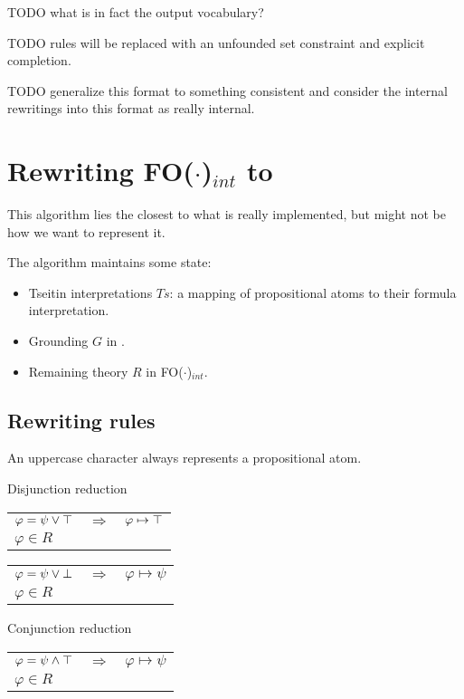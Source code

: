 \documentclass{article}
\newcommand{\indot}{{\sc FO($\cdot$)$_{int}$}\xspace}
\begin{document}
TODO what is in fact the output vocabulary?

TODO rules will be replaced with an unfounded set constraint and explicit completion.

TODO generalize this format to something consistent and consider the internal rewritings into this format as really internal.

\section{Rewriting \indot to \pcdot}
This algorithm lies the closest to what is really implemented, but might not be how we want to represent it.

The algorithm maintains some state:
\begin{itemize}
  \item Tseitin interpretations $Ts$: a mapping of propositional atoms to their formula interpretation.
	\item Grounding $G$ in \pcdot.
	\item Remaining theory $R$ in \indot.    
\end{itemize}

\subsection{Rewriting rules}
An uppercase character always represents a propositional atom.

\noindent Disjunction reduction

\begin{tabular}{|lcl|} \hline
$\varphi=\psi \lor \top$ & $\Longrightarrow$ & $\varphi \mapsto \top$ \\
$\varphi \in R$ &&\\
\hline
\end{tabular}

\begin{tabular}{|lcl|} \hline
$\varphi=\psi \lor \bot$ & $\Longrightarrow$ & $\varphi \mapsto \psi$ \\
$\varphi \in R$ &&\\
\hline
\end{tabular}

\noindent Conjunction reduction

\begin{tabular}{|lcl|} \hline
$\varphi=\psi \land \top$ & $\Longrightarrow$ & $\varphi \mapsto \psi$ \\
$\varphi \in R$ &&\\
\hline
\end{tabular}
\end{document}
